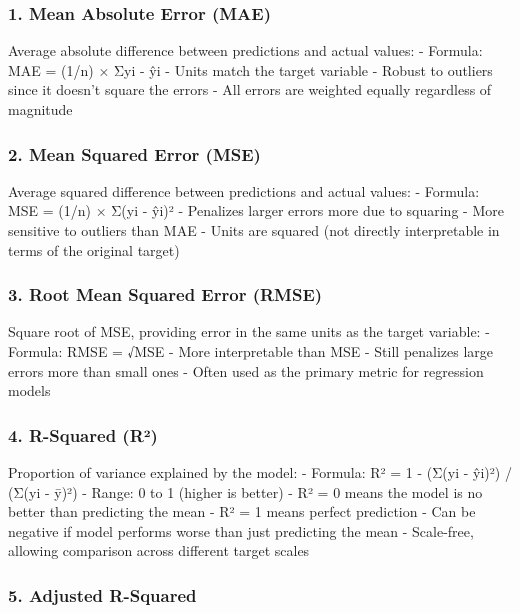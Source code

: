 \documentclass[
  letterpaper,
  DIV=11,
  numbers=noendperiod]{scrreprt}
\begin{document}
\subsubsection{1. Mean Absolute Error
(MAE)}\label{mean-absolute-error-mae}

Average absolute difference between predictions and actual values: -
Formula: MAE = (1/n) × Σ\textbar yi - ŷi\textbar{} - Units match the
target variable - Robust to outliers since it doesn't square the errors
- All errors are weighted equally regardless of magnitude

\subsubsection{2. Mean Squared Error
(MSE)}\label{mean-squared-error-mse}

Average squared difference between predictions and actual values: -
Formula: MSE = (1/n) × Σ(yi - ŷi)² - Penalizes larger errors more due to
squaring - More sensitive to outliers than MAE - Units are squared (not
directly interpretable in terms of the original target)

\subsubsection{3. Root Mean Squared Error
(RMSE)}\label{root-mean-squared-error-rmse}

Square root of MSE, providing error in the same units as the target
variable: - Formula: RMSE = √MSE - More interpretable than MSE - Still
penalizes large errors more than small ones - Often used as the primary
metric for regression models

\subsubsection{4. R-Squared (R²)}\label{r-squared-ruxb2}

Proportion of variance explained by the model: - Formula: R² = 1 - (Σ(yi
- ŷi)²) / (Σ(yi - ȳ)²) - Range: 0 to 1 (higher is better) - R² = 0 means
the model is no better than predicting the mean - R² = 1 means perfect
prediction - Can be negative if model performs worse than just
predicting the mean - Scale-free, allowing comparison across different
target scales

\subsubsection{5. Adjusted R-Squared}\label{adjusted-r-squared}
\end{document}
